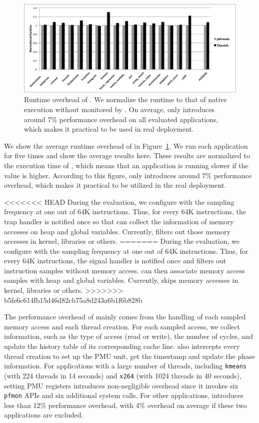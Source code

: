 \begin{figure}[htbp]
\centering
\includegraphics[width=2\columnwidth]{figure/Overhead.pdf}
\caption{Runtime overhead of \Cheetah{}. We normalize the runtime to that of native execution without monitored by \Cheetah{}. On average, \cheetah{} only introduces around 7\% performance overhead on all evaluated applications, which makes it practical to be used in real deployment. \label{fig:overhead}}
\end{figure}

We show the average runtime overhead of \cheetah{} in Figure~\ref{fig:overhead}. We run each application for five times and show the average results here. These results are normalized to the execution time of \pthreads{}, which means that an application is running slower if the value is higher.  According to this figure, \cheetah{} only introduces around 7\% performance overhead, which makes it practical to be utilized in the real deployment. 

<<<<<<< HEAD
During the evaluation, we configure \cheetah{} with the sampling frequency at one out of 64K instructions. Thus, for every 64K instructions, the trap handler is notified once so that \cheetah{} can collect the information of memory accesses on heap and global variables. Currently, \Cheetah{} filters out those memory accesses in kernel, libraries or others. 
=======
During the evaluation, we configure \cheetah{} with the sampling frequency at one out of 64K instructions. Thus, for every 64K instructions, the signal handler is notified once and filters out instruction samples without memory access.
\cheetah{} can then associate memory access samples with heap and global variables. Currently, \Cheetah{} skips memory accesses in kernel, libraries or others. 
>>>>>>> b5fe6c614fb15d46d82cb75a8d243a6b1f6b828b

The performance overhead of \cheetah{} mainly comes from the handling of each sampled memory access and each thread creation. For each sampled access, we collect information, such as the type of access (read or write), the number of cycles, and update  the history table of its corresponding cache line. \cheetah{} also intercepts every thread creation to set up the PMU unit, get the timestamp and update the phase information. For applications with a large number of threads, including \texttt{kmeans} (with 224 threads in 14 seconds) and \texttt{x264} (with 1024 threads in 40 seconds), setting PMU registers introduces non-negligible overhead since it invokes six \texttt{pfmon} APIs and six additional system calls. For other applications, \cheetah{} introduces less than 12\% performance overhead, with 4\% overhead on average if these two applications are excluded.  

